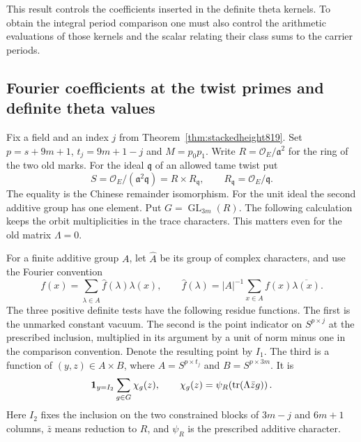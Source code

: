 \documentclass[a4paper,11pt]{article}
\theoremstyle{definition}
\theoremstyle{remark}
\numberwithin{equation}{section}
\newcommand{\OO}{\mathcal O}
\begin{document}
This result controls the coefficients inserted in the
definite theta kernels. To obtain the integral period
comparison one must also control the arithmetic evaluations
of those kernels and the scalar relating their class sums
to the carrier periods.
\clearpage

\subsection{Fourier coefficients at the twist primes and definite theta values}
\label{sec:markedfourier820}
Fix a field and an index \(j\) from Theorem~\ref{thm:stackedheight819}.
Set \(p=s+9m+1\), \(t_j=9m+1-j\) and \(M=p_0p_1\).
Write \(R=\OO_E/\mathfrak a^2\) for the ring of the two old
marks. For the ideal \(\mathfrak q\) of an allowed tame twist put
\[
 S=\OO_E/(\mathfrak a^2\mathfrak q)=R\times R_{\mathfrak q},
 \qquad R_{\mathfrak q}=\OO_E/\mathfrak q .
\]
The equality is the Chinese remainder isomorphism. For the unit
ideal the second additive group has one element. Put
\(G=\operatorname{GL}_{3m}(R)\). The following calculation keeps the
orbit multiplicities in the trace characters. This matters even
for the old matrix \(\Lambda=0\).

For a finite additive group \(A\), let \(\widehat A\) be its
group of complex characters, and use the Fourier convention
\[
 f(x)=\sum_{\lambda\in\widehat A}\widehat f(\lambda)\lambda(x),
 \qquad
 \widehat f(\lambda)=|A|^{-1}\sum_{x\in A}f(x)\overline{\lambda(x)} .
\]
The three positive definite tests have the following residue
functions. The first is the unmarked constant vacuum. The second
is the point indicator on \(S^{p\times j}\) at the prescribed
inclusion, multiplied in its argument by a unit of norm minus
one in the comparison convention. Denote the resulting point by
\(I_1\). The third is a function of
\((y,z)\in A\times B\), where
\(A=S^{p\times t_j}\) and \(B=S^{p\times 3m}\). It is
\[
  {\bf1}_{y=I_2}\sum_{g\in G}\chi_g(z),\qquad
  \chi_g(z)=\psi_R\!\left(\operatorname{tr}(\Lambda\bar z g)\right).
\]
Here \(I_2\) fixes the inclusion on the two constrained blocks
of \(3m-j\) and \(6m+1\) columns, \(\bar z\) means reduction
to \(R\), and \(\psi_R\) is the prescribed additive character.
\end{document}
